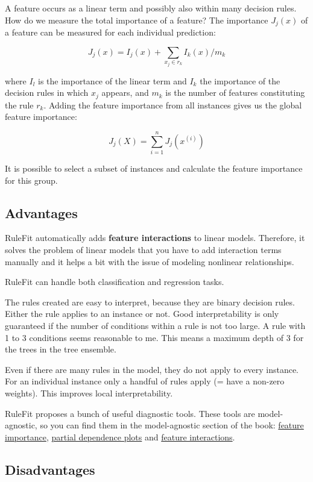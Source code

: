 \documentclass[
  12pt,
]{krantz}
\begin{document}
A feature occurs as a linear term and possibly also within many decision rules.
How do we measure the total importance of a feature?
The importance \(J_j(x)\) of a feature can be measured for each individual prediction:

\[J_j(x)=I_j(x)+\sum_{x_j\in{}r_k}I_k(x)/m_k\]

where \(I_l\) is the importance of the linear term and \(I_k\) the importance of the decision rules in which \(x_j\) appears, and \(m_k\) is the number of features constituting the rule \(r_k\).
Adding the feature importance from all instances gives us the global feature importance:

\[J_j(X)=\sum_{i=1}^n{}J_j(x^{(i)})\]

It is possible to select a subset of instances and calculate the feature importance for this group.

\hypertarget{advantages-4}{%
\subsection{Advantages}\label{advantages-4}}

RuleFit automatically adds \textbf{feature interactions} to linear models.
Therefore, it solves the problem of linear models that you have to add interaction terms manually and it helps a bit with the issue of modeling nonlinear relationships.

RuleFit can handle both classification and regression tasks.

The rules created are easy to interpret, because they are binary decision rules.
Either the rule applies to an instance or not.
Good interpretability is only guaranteed if the number of conditions within a rule is not too large.
A rule with 1 to 3 conditions seems reasonable to me.
This means a maximum depth of 3 for the trees in the tree ensemble.

Even if there are many rules in the model, they do not apply to every instance.
For an individual instance only a handful of rules apply (= have a non-zero weights).
This improves local interpretability.

RuleFit proposes a bunch of useful diagnostic tools.
These tools are model-agnostic, so you can find them in the model-agnostic section of the book: \protect\hyperlink{feature-importance}{feature importance}, \protect\hyperlink{pdp}{partial dependence plots} and \protect\hyperlink{interaction}{feature interactions}.

\hypertarget{disadvantages-4}{%
\subsection{Disadvantages}\label{disadvantages-4}}
\end{document}
